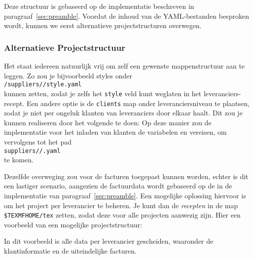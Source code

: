 
Deze structuur is gebaseerd op de implementatie beschreven in paragraaf~\ref{sec:preamble}.
Voordat de inhoud van de YAML-bestanden besproken wordt, kunnen we eerst alternatieve projectstructuren overwegen.

\subsubsection{Alternatieve Projectstructuur}
Het staat iedereen natuurlijk vrij om zelf een gewenste mappenstructuur aan te leggen.
Zo zou je bijvoorbeeld styles onder\\
\hspace*{4em}\texttt{/suppliers//style.yaml}\\
kunnen zetten, zodat je zelfs het \texttt{style} veld kunt weglaten in het leveranciers-recept.
Een andere optie is de \texttt{clients} map onder leveranciersniveau te plaatsen, zodat je niet per ongeluk klanten van leveranciers door elkaar haalt.
Dit zou je kunnen realiseren door het volgende te doen:
\noindent
Op deze manier zou de implementatie voor het inladen van klanten de variabelen  en  vereisen, om vervolgens tot het pad\\
\hspace*{4em}\texttt{suppliers//.yaml}\\
te komen.

Dezelfde overweging zou voor de facturen toegepast kunnen worden, echter is dit een lastiger scenario, aangezien de factuurdata wordt gebaseerd op de  in de implementatie van paragraaf~\ref{sec:preamble}.
Een mogelijke oplossing hiervoor is om het project per leverancier te beheren.
Je kunt dan de \textit{recepten} in de map \texttt{\$TEXMFHOME/tex} zetten, zodat deze voor alle projecten aanwezig zijn.
Hier een voorbeeld van een mogelijke projectstructuur:\\
\begin{minipage}{.49\linewidth}
\end{minipage}%
\hfill
\begin{minipage}{.49\linewidth}
\end{minipage}
In dit voorbeeld is alle data per leverancier gescheiden, waaronder de klantinformatie en de uiteindelijke facturen.

